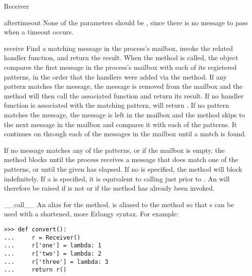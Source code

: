 \documentclass{howto}
\begin{document}
\begin{classdesc}{Receiver}{}
\begin{methoddesc}{after}{timeout}
None of the  parameters should be , since
there is no message to pass when a timeout occurs.
\end{methoddesc}

\begin{methoddesc}{receive}{}
Find a matching message in the process's mailbox, invoke the related handler
function, and return the result. When the  method is called,
the  object compares the first message in the process's mailbox
with each of its registered patterns, in the order that the handlers were added
via the  method. If any pattern matches the message, the
message is removed from the mailbox and the  method will then
call the associated function and return its result. If no handler function is
associated with the matching pattern,  will return
. If no pattern matches the message, the message is left in the
mailbox and the  method skips to the next message in the
mailbox and compares it with each of the patterns. It continues on through each
of the messages in the mailbox until a match is found.

If no message matches any of the patterns, or if the mailbox is empty, the
 method blocks until the process receives a message that does
match one of the patterns, or until the given  has elapsed. If no
 is specified, the  method will block
indefinitely. If a  is specified, it is equivalent to calling
 just prior to
. An  will therefore be raised if
 is not  or if the  method has
already been invoked.
\end{methoddesc}

\begin{methoddesc}{__call__}{}
An alias for the  method.  is aliased to
the  method so that s can be used with a
shortened, more Erlangy syntax. For example:
\begin{verbatim}
>>> def convert():
...     r = Receiver()
...     r['one'] = lambda: 1
...     r['two'] = lambda: 2
...     r['three'] = lambda: 3
...     return r()
\end{verbatim}
\end{methoddesc}


\end{classdesc}
\end{document}
